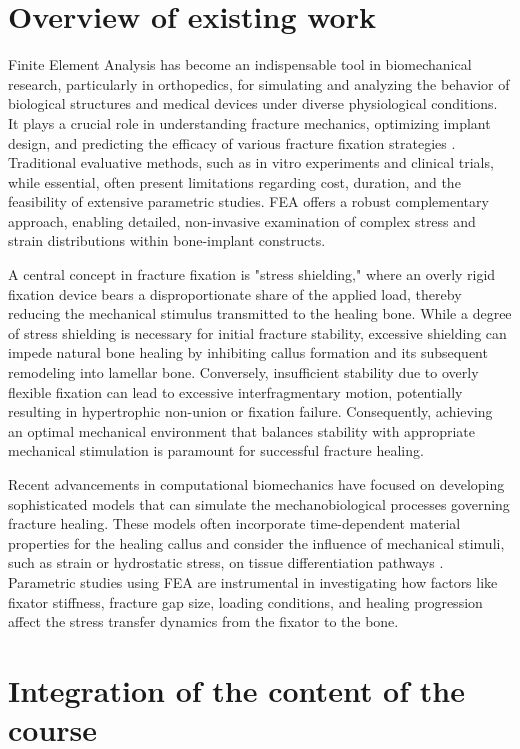 \documentclass{article}
\begin{document}
\section{Overview of existing work}

Finite Element Analysis has become an indispensable tool in biomechanical research, particularly in orthopedics, for simulating and analyzing the behavior of biological structures and medical devices under diverse physiological conditions. It plays a crucial role in understanding fracture mechanics, optimizing implant design, and predicting the efficacy of various fracture fixation strategies \citep{lewis2021finite}. Traditional evaluative methods, such as in vitro experiments and clinical trials, while essential, often present limitations regarding cost, duration, and the feasibility of extensive parametric studies. FEA offers a robust complementary approach, enabling detailed, non-invasive examination of complex stress and strain distributions within bone-implant constructs.

A central concept in fracture fixation is "stress shielding," where an overly rigid fixation device bears a disproportionate share of the applied load, thereby reducing the mechanical stimulus transmitted to the healing bone. While a degree of stress shielding is necessary for initial fracture stability, excessive shielding can impede natural bone healing by inhibiting callus formation and its subsequent remodeling into lamellar bone. Conversely, insufficient stability due to overly flexible fixation can lead to excessive interfragmentary motion, potentially resulting in hypertrophic non-union or fixation failure. Consequently, achieving an optimal mechanical environment that balances stability with appropriate mechanical stimulation is paramount for successful fracture healing.

Recent advancements in computational biomechanics have focused on developing sophisticated models that can simulate the mechanobiological processes governing fracture healing. These models often incorporate time-dependent material properties for the healing callus and consider the influence of mechanical stimuli, such as strain or hydrostatic stress, on tissue differentiation pathways \citep{morgan2024novel}. Parametric studies using FEA are instrumental in investigating how factors like fixator stiffness, fracture gap size, loading conditions, and healing progression affect the stress transfer dynamics from the fixator to the bone.

\section{Integration of the content of the course}
\end{document}
